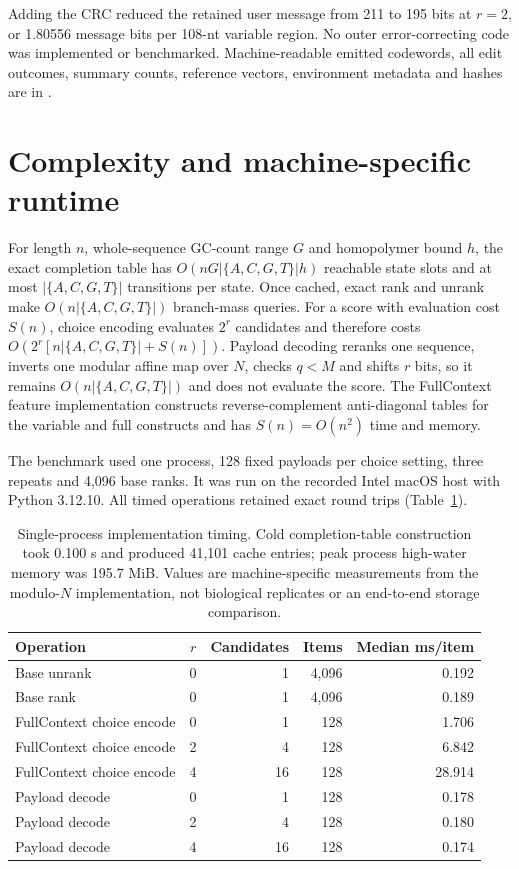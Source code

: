 \documentclass[10pt]{article}
\newcommand{\DNA}{\{A,C,G,T\}}
\begin{document}
Adding the CRC reduced the retained user message from 211 to 195 bits at $r=2$, or 1.80556 message bits per 108-nt variable region. No outer error-correcting code was implemented or benchmarked. Machine-readable emitted codewords, all edit outcomes, summary counts, reference vectors, environment metadata and hashes are in .

\section{Complexity and machine-specific runtime}

For length $n$, whole-sequence GC-count range $G$ and homopolymer bound $h$, the exact completion table has $O(nG|\DNA|h)$ reachable state slots and at most $|\DNA|$ transitions per state. Once cached, exact rank and unrank make $O(n|\DNA|)$ branch-mass queries. For a score with evaluation cost $S(n)$, choice encoding evaluates $2^r$ candidates and therefore costs $O(2^r[n|\DNA|+S(n)])$. Payload decoding reranks one sequence, inverts one modular affine map over $N$, checks $q<M$ and shifts $r$ bits, so it remains $O(n|\DNA|)$ and does not evaluate the score. The FullContext feature implementation constructs reverse-complement anti-diagonal tables for the variable and full constructs and has $S(n)=O(n^2)$ time and memory.

The benchmark used one process, 128 fixed payloads per choice setting, three repeats and 4,096 base ranks. It was run on the recorded Intel macOS host with Python 3.12.10. All timed operations retained exact round trips (Table~\ref{tab:s-runtime}).

\begin{table}[H]
\centering
\small
\begin{tabular}{lrrrr}
\toprule
Operation & $r$ & Candidates & Items & Median ms/item \\
\midrule
Base unrank & 0 & 1 & 4,096 & 0.192 \\
Base rank & 0 & 1 & 4,096 & 0.189 \\
FullContext choice encode & 0 & 1 & 128 & 1.706 \\
FullContext choice encode & 2 & 4 & 128 & 6.842 \\
FullContext choice encode & 4 & 16 & 128 & 28.914 \\
Payload decode & 0 & 1 & 128 & 0.178 \\
Payload decode & 2 & 4 & 128 & 0.180 \\
Payload decode & 4 & 16 & 128 & 0.174 \\
\bottomrule
\end{tabular}
\caption{Single-process implementation timing. Cold completion-table construction took 0.100 s and produced 41,101 cache entries; peak process high-water memory was 195.7 MiB. Values are machine-specific measurements from the modulo-$N$ implementation, not biological replicates or an end-to-end storage comparison.}
\label{tab:s-runtime}
\end{table}
\end{document}
